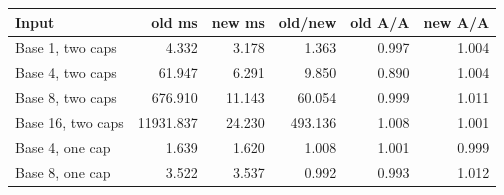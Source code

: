 \begin{center}
\small
\begin{tabular}{lrrrrr}
\toprule
Input & old ms & new ms & old/new & old A/A & new A/A\\
\midrule
Base 1, two caps & 4.332 & 3.178 & 1.363 & 0.997 & 1.004\\
Base 4, two caps & 61.947 & 6.291 & 9.850 & 0.890 & 1.004\\
Base 8, two caps & 676.910 & 11.143 & 60.054 & 0.999 & 1.011\\
Base 16, two caps & 11931.837 & 24.230 & 493.136 & 1.008 & 1.001\\
Base 4, one cap & 1.639 & 1.620 & 1.008 & 1.001 & 0.999\\
Base 8, one cap & 3.522 & 3.537 & 0.992 & 0.993 & 1.012\\
\bottomrule
\end{tabular}
\end{center}
